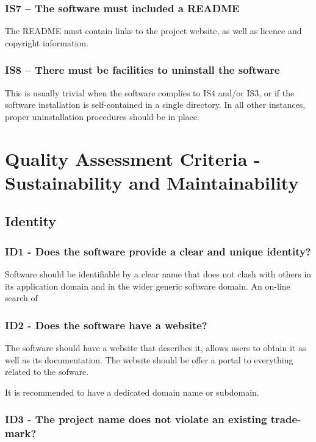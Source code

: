\documentclass[a4paper,11pt]{article}
\begin{document}
\subsubsection{IS7 -- The software must included a README}

The README must contain links to the project website, as well as licence and copyright
information.

\subsubsection{IS8 -- There must be facilities to uninstall the software}

This is usually trivial when the software complies to IS4 and/or IS3, or if the
software installation is self-contained in a single directory. In all other
instances, proper uninstallation procedures should be in place.


\section{Quality Assessment Criteria - Sustainability and Maintainability}

\subsection{Identity}

\subsubsection{ID1 - Does the software provide a clear and unique identity?}

Software should be identifiable by a clear name that does not clash with others
in its application domain and in the wider generic software domain. An on-line
search of 

\subsubsection{ID2 - Does the software have a website?}

The software should have a website that describes it, allows users to obtain
it as well as its documentation. The website should be offer a portal to everything
related to the sofware.

It is recommended to have a dedicated domain name or subdomain.

\subsubsection{ID3 - The project name does not violate an existing trade-mark?}
\end{document}
